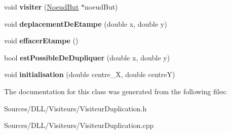 \begin{DoxyCompactItemize}
\item 
void {\bfseries visiter} (\hyperlink{class_noeud_but}{Noeud\+But} $\ast$noeud\+But)\hypertarget{class_visiteur_duplication_a502b0b691ea1e2e8450065e3fe0ccf30}{}\label{class_visiteur_duplication_a502b0b691ea1e2e8450065e3fe0ccf30}

\item 
void {\bfseries deplacement\+De\+Etampe} (double x, double y)\hypertarget{class_visiteur_duplication_af9626c70aaaf9c3dfb3ab20444143498}{}\label{class_visiteur_duplication_af9626c70aaaf9c3dfb3ab20444143498}

\item 
void {\bfseries effacer\+Etampe} ()\hypertarget{class_visiteur_duplication_a7fc04f1d711832e547e8201c5f6ae800}{}\label{class_visiteur_duplication_a7fc04f1d711832e547e8201c5f6ae800}

\item 
bool {\bfseries est\+Possible\+De\+Dupliquer} (double x, double y)\hypertarget{class_visiteur_duplication_aacfe6c9aa6f4c2fc9b7ffa120ebc4375}{}\label{class_visiteur_duplication_aacfe6c9aa6f4c2fc9b7ffa120ebc4375}

\item 
void {\bfseries initialisation} (double centre\+\_\+X, double centreY)\hypertarget{class_visiteur_duplication_a57870e7afd577be8457f1b96990bf6d5}{}\label{class_visiteur_duplication_a57870e7afd577be8457f1b96990bf6d5}

\end{DoxyCompactItemize}


The documentation for this class was generated from the following files\+:\begin{DoxyCompactItemize}
\item 
Sources/\+D\+L\+L/\+Visiteurs/Visiteur\+Duplication.\+h\item 
Sources/\+D\+L\+L/\+Visiteurs/Visiteur\+Duplication.\+cpp\end{DoxyCompactItemize}
